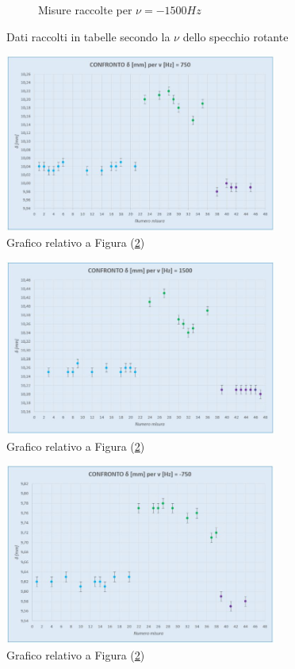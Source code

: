 \documentclass{article}
\begin{document}
\begin{figure}[h]
\begin{subfigure}[h]{0.2\linewidth}
        \caption{Misure raccolte per $\nu=-1500Hz$}
        \label{Tab_-1500}
    \end{subfigure}
        \caption{Dati raccolti in tabelle secondo la $\nu$ dello specchio rotante}
        \label{Tabs}
\end{figure}

\begin{figure}[h]
    \centering
    \includegraphics[width=0.8\textwidth]{Coerenza_G1.JPG}
    \caption{Grafico relativo a Figura (\ref{Tabs})}
    \label{Graf_750}
\end{figure}

\begin{figure}[h]
    \centering
    \includegraphics[width=0.8\textwidth]{Coerenza_G2.JPG}
    \caption{Grafico relativo a Figura (\ref{Tabs})}
    \label{Graf_1500}
\end{figure}

\begin{figure}[h]
    \centering
    \includegraphics[width=0.8\textwidth]{Coerenza_G3.JPG}
    \caption{Grafico relativo a Figura (\ref{Tabs})}
    \label{Graf_-750}
\end{figure}
\end{document}
